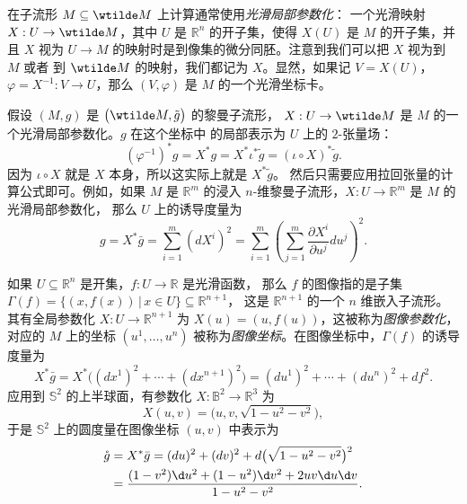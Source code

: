 在子流形 $M\subseteq \wtilde M$ 上计算通常使用\emph{光滑局部参数化}：
一个光滑映射 $X:U\to\wtilde M$，其中 $U$ 是 $\mathbb{R}^n$
的开子集，使得 $X(U)$ 是 $M$ 的开子集，并且 $X$ 视为 $U\to M$
的映射时是到像集的微分同胚。注意到我们可以把 $X$ 视为到 $M$ 或者
到 $\wtilde M$ 的映射，我们都记为 $X$。显然，如果记 $V=X(U)$，
$\varphi=X^{-1}:V\to U$，那么 $(V,\varphi)$ 是 $M$ 的一个光滑坐标卡。

假设 $(M,g)$ 是 $\bigl(\wtilde M,\tilde g\bigr)$ 的黎曼子流形，
$X:U\to\wtilde M$ 是 $M$ 的一个光滑局部参数化。$g$ 在这个坐标中
的局部表示为 $U$ 上的 $2$-张量场：
\[
  (\varphi^{-1})^*g=X^*g=X^*\iota^*\tilde g=(\iota\circ X)^*\tilde g.
\]
因为 $\iota\circ X$ 就是 $X$ 本身，所以这实际上就是 $X^*\tilde g$。
然后只需要应用拉回张量的计算公式即可。例如，如果 $M$ 是 $\mathbb{R}^m$
的浸入 $n$-维黎曼子流形，$X:U\to \mathbb{R}^m$ 是 $M$ 的光滑局部参数化，
那么 $U$ 上的诱导度量为 
\[
  g=X^*\bar g=\sum_{i=1}^m (dX^i)^2
  =\sum_{i=1}^m\left(
    \sum_{j=1}^m\frac{\partial X^i}{\partial u^j}du^j
  \right)^2.
\]

\begin{example}[图像坐标中的度量]
  如果 $U\subseteq \mathbb{R}^n$ 是开集，$f:U\to \mathbb{R}$ 是光滑函数，
  那么 $f$ 的图像指的是子集 $\Gamma(f)=\{(x,f(x))\,|\, x\in U\}\subseteq \mathbb{R}^{n+1}$，
  这是 $\mathbb{R}^{n+1}$ 的一个 $n$ 维嵌入子流形。其有全局参数化 $X:U\to \mathbb{R}^{n+1}$
  为 $X(u)=(u,f(u))$，这被称为\emph{图像参数化}，对应的 $M$ 上的坐标
  $(u^1,\dots,u^n)$ 被称为\emph{图像坐标}。在图像坐标中，$\Gamma(f)$
  的诱导度量为
  \[
    X^*\bar g=X^*\bigl(
      (dx^1)^2+\cdots+(dx^{n+1})^2
    \bigr)=(du^1)^2+\cdots+(du^n)^2+df^2.
  \]
  应用到 $\mathbb{S}^2$ 的上半球面，有参数化 $X: \mathbb{B}^2\to \mathbb{R}^3$
  为
  \[
    X(u,v)=\bigl(u,v,\sqrt{1-u^2-v^2}\bigr),
  \]
  于是 $\mathbb{S}^2$ 上的圆度量在图像坐标 $(u,v)$ 中表示为
  \begin{align*}
    \mathring{g}&=X^*\bar g=(du)^2+(dv)^2+d\bigl(\sqrt{1-u^2-v^2}\bigr)^2\\
    &=\frac{(1-v^2)\d u^2+(1-u^2)\d v^2+2uv\d u\d v}{1-u^2-v^2}.
  \end{align*}
\end{example}

